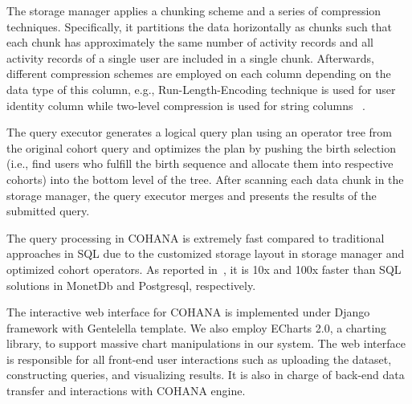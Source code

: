 The storage manager applies a chunking scheme and a series of compression techniques. Specifically, it partitions the data horizontally as chunks such that each chunk has approximately the same number of activity records and all activity records of a single user are included in a single chunk. Afterwards, different compression schemes are employed on each column depending on the data type of this column, e.g., Run-Length-Encoding technique is used for user identity column while two-level compression is used for string columns ~\cite{jiang2016cohort}. %

The query executor generates a logical query plan using an operator tree from the original cohort query and optimizes the plan by pushing the birth selection (i.e., find users who fulfill the birth sequence and allocate them into respective cohorts) into the bottom level of the tree. After scanning each data chunk in the storage manager, the query executor merges and presents the results of the submitted query.

The query processing in COHANA is extremely fast compared to traditional approaches in SQL due to the customized storage layout in storage manager and optimized cohort operators. As reported in~\cite{jiang2016cohort}, it is 10x and 100x faster than SQL solutions in MonetDb\cite{boncz2005monetdb} and Postgresql\cite{momjian2001postgresql}, respectively.

The interactive web interface for COHANA is implemented under Django\cite{django} framework with Gentelella\cite{gentelella} template. We also employ ECharts 2.0\cite{echarts}, a charting library, to support massive chart manipulations in our system. 
The web interface is responsible for all front-end user interactions such as uploading the dataset, constructing queries, and visualizing results. 
It is also in charge of back-end data transfer and interactions with COHANA engine. 

